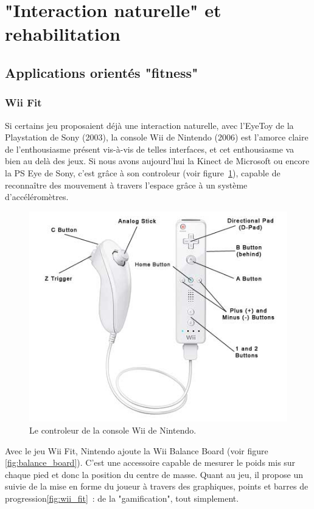 \section{"Interaction naturelle" et rehabilitation}

\subsection{Applications orientés "fitness"}

\subsubsection{Wii Fit}

Si certains jeu proposaient déjà une interaction naturelle, avec l'EyeToy 
de la Playstation de Sony (2003), la console Wii de Nintendo (2006) est 
l'amorce claire de l'enthousiasme présent vis-à-vis de telles interfaces, et cet enthousiasme va bien
au delà des jeux. 
Si nous avons aujourd'hui la Kinect de Microsoft ou encore la
PS Eye de Sony, c'est grâce à son controleur (voir figure~\ref{fig:wii}), 
capable de reconnaître des mouvement à 
travers l'espace grâce à un système d'accéléromètres. 

\begin{figure}[h!]
\centering
\includegraphics[width=0.7\linewidth]{images/wii_diagram}
\caption{Le controleur de la console Wii de Nintendo.}
\label{fig:wii}
\end{figure}

Avec le jeu Wii Fit, Nintendo ajoute la Wii Balance Board (voir figure 
\ref{fig:balance_board}). C'est une accessoire capable de mesurer le 
poids mis sur chaque pied et donc la position du centre de masse. Quant au jeu,
il propose un suivie de la mise en forme du joueur à travers des graphiques, 
points et barres de progression\ref{fig:wii_fit}~: de la "gamification", 
tout simplement.

